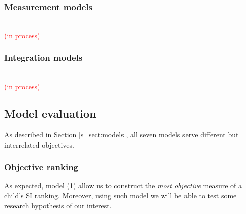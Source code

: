 \subsubsection{Measurement models} \\
%
\textcolor{red}{(in process)}

\begin{comment}
	
	Identification of model:  
	soft identification (see \citet{Depaoli_2021}) 
	
	Considering the intelligibility of any stimulus is determined by three interrelated parties: the message, speaker, and listener, and that the inherent variability within each integrating part could be high, the current research assumes the utterances are equivalent among each other.
	
	It will consider the correlation with the entropy measure.
	\begin{enumerate}
		\item \textbf{Dichotomous CJ (CJ-D):} the Bradley-Terry-Luce model (BTL) \citep{Bradley_et_al_1952, Luce_1959}, used when the comparative judgments are dichotomous (CJ-D), 
		\item \textbf{Ordinal CJ (CJ-O):} the Generalized Bradley-Terry-Luce model BTL(k) \citep{Tutz_1986, Agresti_1992}, used when the comparative ordinal CJ (CJ-O).
		\item \textbf{Absolute (holistic) judgments (HJ):}
	\end{enumerate}
\end{comment}
%
%
\subsubsection{Integration models} \\
%
\textcolor{red}{(in process)} \\
%
%
\subsection{Model evaluation} \label{s_sect:evaluation}
%
As described in Section \ref{s_sect:models}, all seven models serve different but interrelated objectives.
%
%
\subsubsection{Objective ranking}
%
As expected, model (1) allow us to construct the \textit{most objective} measure of a child's SI ranking. Moreover, using such model we will be able to test some research hypothesis of our interest.
%
%
